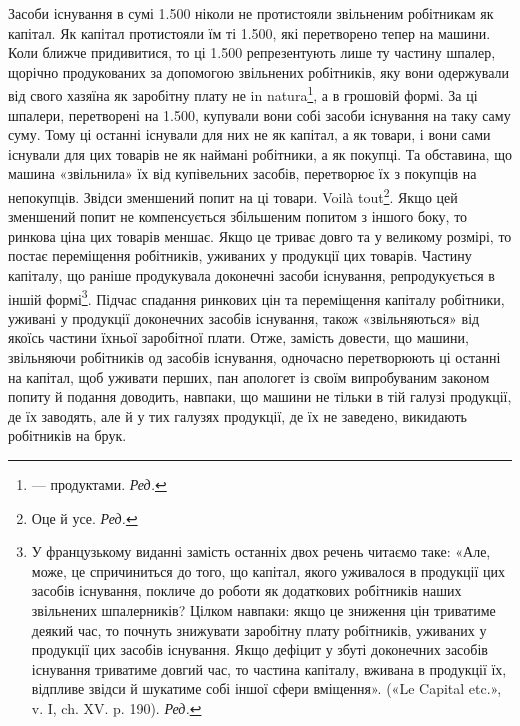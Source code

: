 Засоби існування в сумі \num{1.500} ніколи не протистояли
звільненим робітникам як капітал. Як капітал протистояли
їм ті \num{1.500}, які перетворено тепер на
машини. Коли ближче придивитися, то ці \num{1.500}
репрезентують лише ту частину шпалер, щорічно продукованих
за допомогою звільнених робітників, яку вони одержували
від свого хазяїна як заробітну плату не in natura\footnote*{
— продуктами. \emph{Ред.}
}, а в грошовій
формі. За ці шпалери, перетворені на \num{1.500},
купували вони собі засоби існування на таку саму суму. Тому ці
останні існували для них не як капітал, а як товари, і вони сами
існували для цих товарів не як наймані робітники, а як покупці.
Та обставина, що машина «звільнила» їх від купівельних засобів,
перетворює їх з покупців на непокупців. Звідси зменшений
попит на ці товари. Voilà tout\footnote*{
Оце й усе. \emph{Ред.}
}. Якщо цей зменшений попит не
компенсується збільшеним попитом з іншого боку, то ринкова
ціна цих товарів меншає. Якщо це триває довго та у великому
розмірі, то постає переміщення робітників, уживаних у продукції
цих товарів. Частину капіталу, що раніше продукувала доконечні
засоби існування, репродукується в іншій формі\footnote*{
У французькому виданні замість останніх двох речень читаємо
таке: «Але, може, це спричиниться до того, що капітал, якого уживалося
в продукції цих засобів існування, покличе до роботи як додаткових
робітників наших звільнених шпалерників? Цілком навпаки: якщо це
зниження цін триватиме деякий час, то почнуть знижувати заробітну плату
робітників, уживаних у продукції цих засобів існування. Якщо дефіцит
у збуті доконечних засобів існування триватиме довгий час, то частина
капіталу, вживана в продукції їх, відпливе звідси й шукатиме собі іншої
сфери вміщення». («Le Capital etc.», v. I, ch. XV. p. 190). \emph{Ред.}
}. Підчас спадання
ринкових цін та переміщення капіталу робітники, уживані
у продукції доконечних засобів існування, також «звільняються»
від якоїсь частини їхньої заробітної плати. Отже, замість
довести, що машини, звільняючи робітників од засобів існування,
одночасно перетворюють ці останні на капітал, щоб уживати
перших, пан апологет із своїм випробуваним законом попиту й
подання доводить, навпаки, що машини не тільки в тій галузі
продукції, де їх заводять, але й у тих галузях продукції, де їх
не заведено, викидають робітників на брук.


